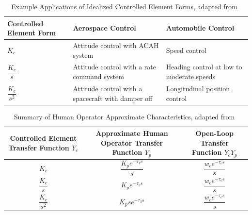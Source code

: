 \documentclass[float=false, crop=false]{standalone}
\begin{document}
\begin{table}[tb]
    \centering
    \caption{Example Applications of Idealized Controlled Element Forms, adapted from~\cite{McRuer1974}}
    \label{table:mcruer1974a}
    \small
    \begin{tabular}{p{.2\linewidth} *{2}{p{.3\linewidth}}}
        \toprule
            Controlled Element Form & Aerospace Control & Automobile Control \\
        \midrule
            $K_c$ & Attitude control with ACAH system & Speed control \\
            $\dfrac{K_c}{s}$ & Attitude control with a rate command system & Heading control at low to moderate speeds \\
            $\dfrac{K_c}{s^2}$ & Attitude control with a spacecraft with damper off & Longitudinal position control \\
        \bottomrule
    \end{tabular}
\end{table}

\begin{table}[tb]
    \renewcommand{\arraystretch}{2}
    \centering
    \caption{Summary of Human Operator Approximate Characteristics, adapted from~\cite{McRuer1974}}
    \label{table:mcruer1974b}
    \small
    \begin{tabular}{*{3}{c}}
         \toprule
            \thead{Controlled Element\\ Transfer Function\\ $Y_c$} & \thead{Approximate Human Operator\\ Transfer Function\\ $Y_p$} & \thead{Open-Loop\\ Transfer Function\\ $Y_c Y_p$} \\
        \midrule
            $K_c$ & $\dfrac{K_p e^{-\tau_1 s}}{s}$ & $\dfrac{w_c e^{-\tau_e s}}{s}$ \\
            $\dfrac{K_c}{s}$ & $K_p e^{-\tau_2 s}$ & $\dfrac{w_c e^{-\tau_e s}}{s}$ \\
            $\dfrac{K_c}{s^2}$ & $K_p s e^{-\tau_3 s}$ & $\dfrac{w_c e^{-\tau_e s}}{s}$ \\
        \bottomrule
    \end{tabular}
\end{table}
\end{document}
